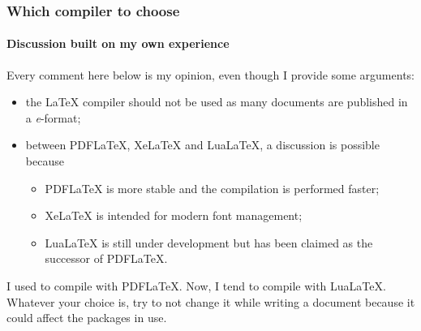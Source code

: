 \documentclass[11pt]{beamer}
\begin{document}
\begin{frame}
	\frametitle{Which compiler to choose}
	\framesubtitle{Discussion built on my own experience}

	Every comment here below is my opinion, even though I provide some arguments:
	\begin{itemize}
		\item the LaTeX compiler should not be used as many documents are published in a \textit{e}-format;
		\item between PDFLaTeX, XeLaTeX and LuaLaTeX, a discussion is possible because
		\begin{itemize}
			\item PDFLaTeX is more stable and the compilation is performed faster;
			\item XeLaTeX is intended for modern font management;
			\item LuaLaTeX is still under development but has been claimed as the successor of PDFLaTeX.
		\end{itemize}
	\end{itemize}

	I used to compile with PDFLaTeX. Now, I tend to compile with LuaLaTeX.
	Whatever your choice is, try to not change it while writing a document because it could affect the packages in use.
\end{frame}


  

\end{document}
